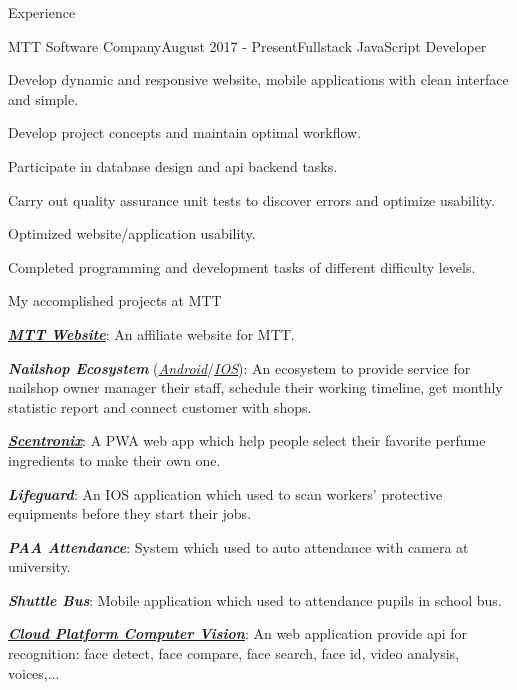 \documentclass{resume}
\begin{document}
  \begin{rSection}{Experience}
    \begin{rSubsection}{MTT Software Company}{August 2017 - Present}{Fullstack JavaScript Developer}{}
      \item Develop dynamic and responsive website, mobile applications with clean interface and simple.
      \item Develop project concepts and maintain optimal workflow.
      \item Participate in database design and api backend tasks.
      \item Carry out quality assurance unit tests to discover errors and optimize usability.
      \item Optimized website/application usability.
      \item Completed programming and development tasks of different difficulty levels.
    \end{rSubsection}
     
    \begin{rSubsection}{}{}{My accomplished projects at MTT}{}
      \item \href{https://mttjsc.com/}{\emph{\bfseries{MTT Website}}}: An affiliate website for MTT.
      \item \emph{\bfseries{Nailshop Ecosystem}} (\href{https://play.google.com/store/apps/developer?id=MTT+Software+Company+LTD}{\emph{Android}}/\href{https://apps.apple.com/us/developer/mttjsc/id1250334932}{\emph{IOS}}): 
      An ecosystem to provide service for nailshop owner manager their staff, schedule their working timeline, get monthly statistic report and connect customer with shops.
      \item \href{https://app.scnt.me/}{\emph{\bfseries{Scentronix}}}: A PWA web app which help people select their favorite perfume ingredients to make their own one.
      \item {\emph{\bfseries{Lifeguard}}}: An IOS application which used to scan workers' protective equipments before they start their jobs. 
      \item {\emph{\bfseries{PAA Attendance}}}: System which used to auto attendance with camera at university.
      \item {\emph{\bfseries{Shuttle Bus}}}: Mobile application which used to attendance pupils in school bus.
      \item \href{https://dev.console.phenikaa.cloud/}{\emph{\bfseries{Cloud Platform Computer Vision}}}: An web application provide api for recognition: face detect, face compare, face search, face id, video analysis, voices,...
    \end{rSubsection}
  \end{rSection}
\end{document}
